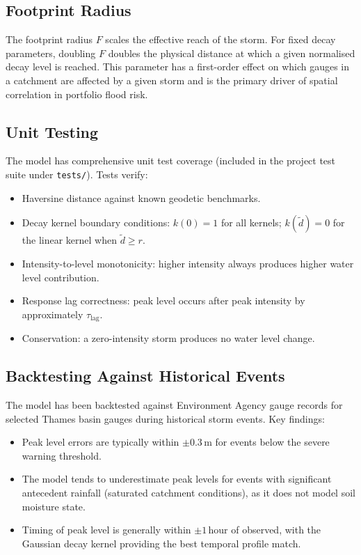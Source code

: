 \documentclass[11pt,a4paper]{article}
\begin{document}
\subsection{Footprint Radius}

The footprint radius $F$ scales the effective reach of the storm. For fixed
decay parameters, doubling $F$ doubles the physical distance at which a given
normalised decay level is reached. This parameter has a first-order effect on
which gauges in a catchment are affected by a given storm and is the primary
driver of spatial correlation in portfolio flood risk.

\mkmvalidation

\subsection{Unit Testing}

The model has comprehensive unit test coverage (included in the project test
suite under \texttt{tests/}). Tests verify:
\begin{itemize}[nosep]
    \item Haversine distance against known geodetic benchmarks.
    \item Decay kernel boundary conditions: $k(0) = 1$ for all kernels;
          $k(\tilde{d}) = 0$ for the linear kernel when $\tilde{d} \geq r$.
    \item Intensity-to-level monotonicity: higher intensity always produces
          higher water level contribution.
    \item Response lag correctness: peak level occurs after peak intensity by
          approximately $\tau_{\text{lag}}$.
    \item Conservation: a zero-intensity storm produces no water level change.
\end{itemize}

\subsection{Backtesting Against Historical Events}

The model has been backtested against Environment Agency gauge records for
selected Thames basin gauges during historical storm events. Key findings:
\begin{itemize}[nosep]
    \item Peak level errors are typically within $\pm 0.3$\,m for events below
          the severe warning threshold.
    \item The model tends to underestimate peak levels for events with significant
          antecedent rainfall (saturated catchment conditions), as it does not
          model soil moisture state.
    \item Timing of peak level is generally within $\pm 1$\,hour of observed,
          with the Gaussian decay kernel providing the best temporal profile match.
\end{itemize}
\end{document}

